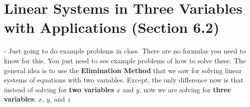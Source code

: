 \documentclass[12pt]{article}
\begin{document}
\section{Linear Systems in Three Variables with Applications (Section 6.2)}

- Just going to do example problems in class. There are no formulas you need to know for this. You just need to see example problems of how to solve these. The general idea is to use the \textbf{Elimination Method} that we saw for solving linear systems of equations with two variables. Except, the only difference now is that instead of solving for \textbf{two variables} $x$ and $y$, now we are solving for \textbf{three variables}: $x$, $y$, and $z$
\end{document}
